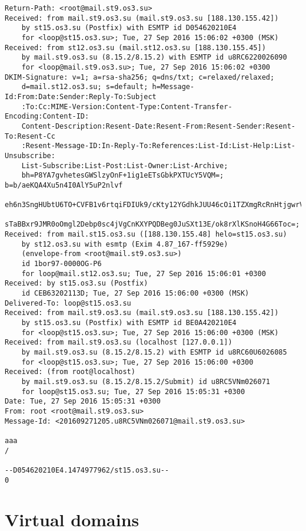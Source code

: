 \documentclass[10pt]{article}
\begin{document}
\begin{verbatim}
Return-Path: <root@mail.st9.os3.su>
Received: from mail.st9.os3.su (mail.st9.os3.su [188.130.155.42])
    by st15.os3.su (Postfix) with ESMTP id D054620210E4
    for <loop@st15.os3.su>; Tue, 27 Sep 2016 15:06:02 +0300 (MSK)
Received: from st12.os3.su (mail.st12.os3.su [188.130.155.45])
    by mail.st9.os3.su (8.15.2/8.15.2) with ESMTP id u8RC6220026090
    for <loop@mail.st9.os3.su>; Tue, 27 Sep 2016 15:06:02 +0300
DKIM-Signature: v=1; a=rsa-sha256; q=dns/txt; c=relaxed/relaxed;
    d=mail.st12.os3.su; s=default; h=Message-Id:From:Date:Sender:Reply-To:Subject
    :To:Cc:MIME-Version:Content-Type:Content-Transfer-Encoding:Content-ID:
    Content-Description:Resent-Date:Resent-From:Resent-Sender:Resent-To:Resent-Cc
    :Resent-Message-ID:In-Reply-To:References:List-Id:List-Help:List-Unsubscribe:
    List-Subscribe:List-Post:List-Owner:List-Archive;
    bh=P8YA7gvhetesGWSlzyOnF+1ig1eETsGbkPXTUcY5VQM=; b=b/aeKQA4Xu5n4I0AlY5uP2nlvf
    eh6n3SngHUbtU6TO+CVFB1v6rtqiFDIUk9/cKty12YGdhkJUU46cOi1TZXmgRcRnHtjgwrVSi2VGp
    sTaBBxr9JMR0oOmgl2Debp0sc4jVgCnKXYPQDBeg0JuSXt13E/ok8rXlKSnoH4G66Toc=;
Received: from mail.st15.os3.su ([188.130.155.48] helo=st15.os3.su)
    by st12.os3.su with esmtp (Exim 4.87_167-ff5929e)
    (envelope-from <root@mail.st9.os3.su>)
    id 1bor97-0000OG-P6
    for loop@mail.st12.os3.su; Tue, 27 Sep 2016 15:06:01 +0300
Received: by st15.os3.su (Postfix)
    id CEB63202113D; Tue, 27 Sep 2016 15:06:00 +0300 (MSK)
Delivered-To: loop@st15.os3.su
Received: from mail.st9.os3.su (mail.st9.os3.su [188.130.155.42])
    by st15.os3.su (Postfix) with ESMTP id BE0A420210E4
    for <loop@st15.os3.su>; Tue, 27 Sep 2016 15:06:00 +0300 (MSK)
Received: from mail.st9.os3.su (localhost [127.0.0.1])
    by mail.st9.os3.su (8.15.2/8.15.2) with ESMTP id u8RC60U6026085
    for <loop@st15.os3.su>; Tue, 27 Sep 2016 15:06:00 +0300
Received: (from root@localhost)
    by mail.st9.os3.su (8.15.2/8.15.2/Submit) id u8RC5VNm026071
    for loop@st15.os3.su; Tue, 27 Sep 2016 15:05:31 +0300
Date: Tue, 27 Sep 2016 15:05:31 +0300
From: root <root@mail.st9.os3.su>
Message-Id: <201609271205.u8RC5VNm026071@mail.st9.os3.su>

aaa
/

--D054620210E4.1474977962/st15.os3.su--
0
\end{verbatim}


\section{Virtual domains\newline}
\end{document}
